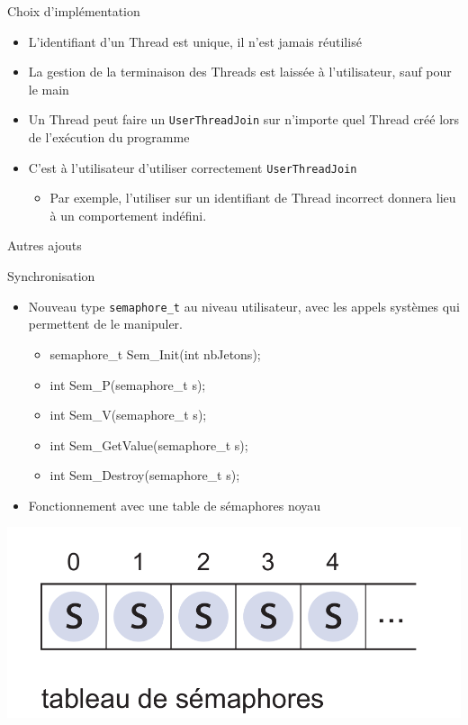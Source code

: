 \documentclass{beamer}
\begin{document}
\begin{frame}
	\begin{block}{Choix d’implémentation }
		\begin{itemize}[<+->]
			\item L'identifiant d'un Thread est unique, il n'est jamais réutilisé
			\item La gestion de la terminaison des Threads est laissée à l'utilisateur, sauf pour le main
			\item Un Thread peut faire un \texttt{UserThreadJoin} sur n'importe quel Thread créé lors de l'exécution du programme
			\item C'est à l'utilisateur d'utiliser correctement \texttt{UserThreadJoin}
			\begin{itemize}
				\item Par exemple, l'utiliser sur un identifiant de Thread incorrect donnera lieu à un comportement indéfini.
			\end{itemize}			
		\end{itemize}
	\end{block}
\end{frame}

\begin{frame}{Autres ajouts}
	\begin{block}{Synchronisation }
		\begin{itemize}
			\item<1-> Nouveau type \texttt{semaphore\_t} au niveau utilisateur, avec les appels systèmes qui permettent de le manipuler.
			\begin{itemize}
				\item<2-> semaphore\_t Sem\_Init(int nbJetons);
				\item<3-> int Sem\_P(semaphore\_t s);
				\item<4-> int Sem\_V(semaphore\_t s);
				\item<5-> int Sem\_GetValue(semaphore\_t s);
				\item<6-> int Sem\_Destroy(semaphore\_t s);
			\end{itemize}
			\item<7-> Fonctionnement avec une table de sémaphores noyau
		\end{itemize}
	\end{block}
	  	\begin{center}
	  		\includegraphics[scale=0.14]{images/FS7.png}
  	\end{center}
\end{frame}
\end{document}
